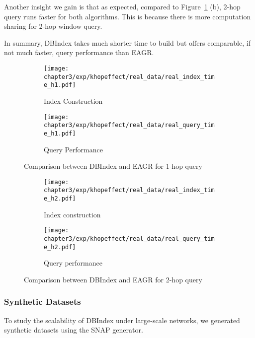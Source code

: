 Another insight we gain is that as expected, compared to Figure~\ref{fig:1-hop-real} (b), 
2-hop query runs faster for both algorithms. This is because there is more computation sharing for 2-hop window query. 

In summary, 
DBIndex takes much shorter time to build but offers comparable, if not much faster, query 
performance than EAGR.


\begin{figure}[h]
\centering
\begin{subfigure}{0.48\linewidth}
  \centering
  \texttt{[image: chapter3/exp/khopeffect/real\_data/real\_index\_time\_h1.pdf]}
  \caption{Index Construction}
\end{subfigure} \begin{subfigure}{0.48\linewidth}
  \centering
  \texttt{[image: chapter3/exp/khopeffect/real\_data/real\_query\_time\_h1.pdf]}
  \caption{Query Performance}
\end{subfigure}%
\caption{Comparison between DBIndex and EAGR  for 1-hop query}
\label{fig:1-hop-real}
\end{figure}

\begin{figure}[h]
\centering
\begin{subfigure}{0.48\linewidth}
  \centering
  \texttt{[image: chapter3/exp/khopeffect/real\_data/real\_index\_time\_h2.pdf]}
  \caption{Index construction}
\end{subfigure}
\begin{subfigure}{0.48\linewidth}
  \centering
  \texttt{[image: chapter3/exp/khopeffect/real\_data/real\_query\_time\_h2.pdf]}
  \caption{Query performance}
\end{subfigure}
\caption{Comparison between DBIndex and EAGR for 2-hop query}
\label{fig:2-hop-real}
\end{figure}


\subsubsection{Synthetic Datasets}
To study the scalability of DBIndex under large-scale networks, 
we generated synthetic datasets using the SNAP generator. 



